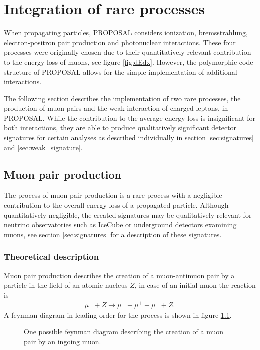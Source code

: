 \chapter{Integration of rare processes}

When propagating particles, PROPOSAL considers ionization, bremsstrahlung, electron-positron pair production and photonuclear interactions.
These four processes were originally chosen due to their quantitatively relevant contribution to the energy loss of muons, see figure \ref{fig:dEdx}.
However, the polymorphic code structure of PROPOSAL allows for the simple implementation of additional interactions.

The following section describes the implementation of two rare processes, the production of muon pairs and the weak interaction of charged leptons, in PROPOSAL.
While the contribution to the average energy loss is insignificant for both interactions, they are able to produce qualitatively significant detector signatures for certain analyses as described individually in section \ref{sec:signatures} and \ref{sec:weak_signature}. 

\section{Muon pair production}

The process of muon pair production is a rare process with a negligible contribution to the overall energy loss of a propagated particle.
Although quantitatively negligible, the created signatures may be qualitatively relevant for neutrino observatories such as IceCube or underground detectors examining muons, see section \ref{sec:signatures} for a description of these signatures.

\subsection{Theoretical description}

Muon pair production describes the creation of a muon-antimuon pair by a particle in the field of an atomic nucleus $Z$, in case of an initial muon the reaction is
\begin{align*}
    \mu^- + Z \rightarrow \mu^- + \mu^+ + \mu^- + Z.
\end{align*}
A feynman diagram in leading order for the process is shown in figure \ref{fig:feynman_mupair}.

\begin{figure}
	\centering
	
    \caption{One possible feynman diagram describing the creation of a muon pair by an ingoing muon.}
    \label{fig:feynman_mupair}
\end{figure}

